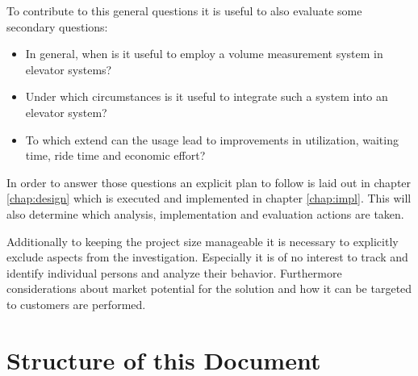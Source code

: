 To contribute to this general questions it is useful to also evaluate some secondary questions:

\begin{itemize}
    \item In general, when is it useful to employ a volume measurement system in elevator systems? 
    \item Under which circumstances is it useful to integrate such a system into an elevator system?
    \item To which extend can the usage lead to improvements in utilization, waiting time, ride time and economic effort?
\end{itemize}

In order to answer those questions an explicit plan to follow is laid out in chapter \ref{chap:design} which is executed and implemented in chapter \ref{chap:impl}. 
This will also determine which analysis, implementation and evaluation actions are taken.

Additionally to keeping the project size manageable it is necessary to explicitly exclude aspects from the  investigation. 
Especially it is of no interest to track and identify individual persons and analyze their behavior.
Furthermore considerations about market potential for the solution and how it can be targeted to customers are performed. 





\section{Structure of this Document}

